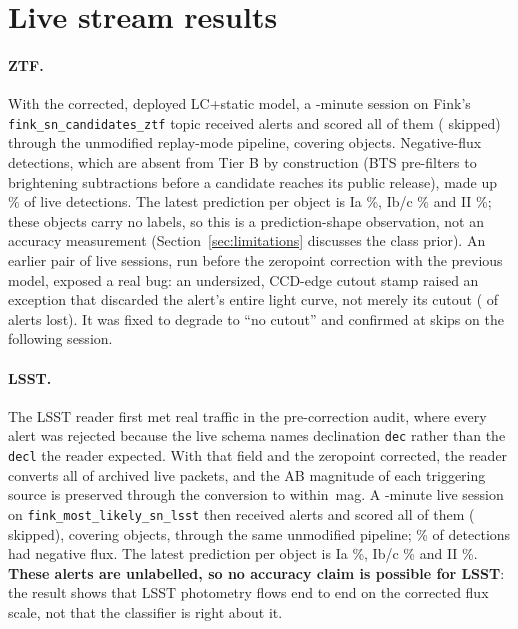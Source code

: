 \section{Live stream results}

\paragraph{ZTF.} With the corrected, deployed LC+static model, a
\LiveNovZtfElapsedMin{}-minute session on Fink's \texttt{fink\_sn\_\allowbreak candidates\_\allowbreak ztf}
topic received \LiveNovZtfNReceived{} alerts and scored all of them
(\LiveNovZtfNSkipped{} skipped) through the unmodified replay-mode pipeline,
covering \LiveNovZtfNObjects{} objects. Negative-flux detections, which are
absent from Tier B by construction (BTS pre-filters to brightening
subtractions before a candidate reaches its public release), made up
\LiveNovZtfNegFluxFrac{}\% of live detections. The latest prediction per
object is Ia \LiveNovZtfRawIa{}\%, Ib/c \LiveNovZtfRawIbc{}\% and II
\LiveNovZtfRawII{}\%; these objects carry no labels, so this is a
prediction-shape observation, not an accuracy measurement
(Section~\ref{sec:limitations} discusses the class prior). An earlier pair
of live sessions, run before the zeropoint correction with the previous
model, exposed a real bug: an undersized, CCD-edge cutout stamp raised an
exception that discarded the alert's entire light curve, not merely its
cutout (\LiveZtfRunOneNSkipped{} of \LiveZtfRunOneNReceived{} alerts lost).
It was fixed to degrade to ``no cutout'' and confirmed at
\LiveZtfRunTwoNSkipped{} skips on the following session.

\paragraph{LSST.} The LSST reader first met real traffic in the
pre-correction audit, where every alert was rejected because the live
schema names declination \texttt{dec} rather than the \texttt{decl} the
reader expected. With that field and the zeropoint corrected, the reader
converts all \LsstArchiveNConverted{} of \LsstArchiveNPackets{} archived live
packets, and the AB magnitude of each triggering source is preserved
through the conversion to within \LsstArchiveMaxDmag{}\,mag. A
\LiveNovLsstElapsedMin{}-minute live session on
\texttt{fink\_most\_\allowbreak likely\_sn\_\allowbreak lsst} then received \LiveNovLsstNReceived{}
alerts and scored all of them (\LiveNovLsstNSkipped{} skipped), covering
\LiveNovLsstNObjects{} objects, through the same unmodified pipeline;
\LiveNovLsstNegFluxFrac{}\% of detections had negative flux. The latest
prediction per object is Ia \LiveNovLsstRawIa{}\%, Ib/c
\LiveNovLsstRawIbc{}\% and II \LiveNovLsstRawII{}\%. \textbf{These alerts are
unlabelled, so no accuracy claim is possible for LSST}: the result shows
that LSST photometry flows end to end on the corrected flux scale, not
that the classifier is right about it.

